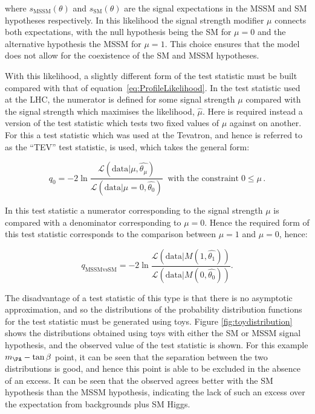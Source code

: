 where $s_{\text{MSSM}}(\theta)$ and $s_{\text{SM}}(\theta)$ are the
signal expectations in the \ac{MSSM} and \ac{SM} hypotheses respectively. In
this likelihood the signal strength modifier $\mu$ connects both expectations,
with the null hypothesis being the \ac{SM} for $\mu=0$ and the alternative
hypothesis the \ac{MSSM} for $\mu=1$. This choice ensures that the model does
not allow for the coexistence of the \ac{SM} and \ac{MSSM} hypotheses. 

With this likelihood, a slightly different form of the test statistic must be
built compared with that of equation~\ref{eq:ProfileLikelihood}. In the test
statistic used at the LHC, the numerator is defined for some signal
strength $\mu$ compared with the signal strength which maximises the likelihood,
$\hat{\mu}$. Here is required instead a version of the test statistic which tests
two fixed values of $\mu$ against on another. For this a test statistic
which was used at the Tevatron, and hence is referred to as the ``TEV'' test
statistic, is used, which takes the general form:

\begin{equation}
q_{0} = -2\ln\frac{\mathcal{L}(\text{data}| \mu,\hat{\theta_{\mu}} ) }
{\mathcal{L}(\text{data}|\mu=0,\hat{\theta_{0}})}
\;\; \text{with the constraint} \; 0\leq\mu\, .
\end{equation}

In this test statistic a numerator corresponding to the signal strength $\mu$ is
compared with a denominator corresponding to $\mu=0$. Hence the required form of this
test statistic corresponds to the comparison between
$\mu=1$ and $\mu=0$, hence:

\begin{equation}
q_{\text{MSSMvsSM}} = -2\ln\frac{\mathcal{L}(\text{data}| M(1,\hat{\theta_{1}}) ) }
{\mathcal{L}(\text{data}| M(0,\hat{\theta_{0}}) )}.
\label{eq:qMSSMvsSM}
\end{equation}

The disadvantage of a test statistic of this type is that there is no asymptotic
approximation, and so the distributions of the probability distribution
functions for the test statistic must be generated using toys. Figure
\ref{fig:toydistribution} shows the distributions obtained using toys with
either the \ac{SM} or \ac{MSSM} signal hypothesis, and the observed value of the
test statistic is shown. For this example $m_{\PA}-\tan\beta$ point, it can be
seen that the separation between the two distributions is good, and hence this
point is able to be excluded in the absence of an excess. It can be seen that
the observed agrees better with the \ac{SM} hypothesis than the \ac{MSSM}
hypothesis, indicating the lack of such an excess over the expectation from
backgrounds plus \ac{SM} Higgs. 

